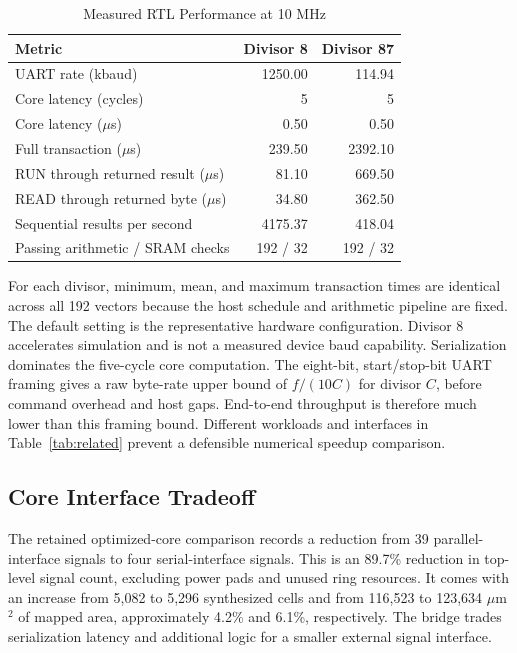 \documentclass[conference,letterpaper]{IEEEtran}
\begin{document}
\begin{table}[t]
\caption{Measured RTL Performance at 10 MHz}
\label{tab:performance}\centering\footnotesize
\begin{tabular}{lrr}\toprule
Metric & Divisor 8 & Divisor 87\\\midrule
UART rate (kbaud) & 1250.00 & 114.94\\
Core latency (cycles) & 5 & 5\\
Core latency ($\mu$s) & 0.50 & 0.50\\
Full transaction ($\mu$s) & 239.50 & 2392.10\\
RUN through returned result ($\mu$s) & 81.10 & 669.50\\
READ through returned byte ($\mu$s) & 34.80 & 362.50\\
Sequential results per second & 4175.37 & 418.04\\
Passing arithmetic / SRAM checks & 192 / 32 & 192 / 32\\\bottomrule
\end{tabular}
\end{table}

For each divisor, minimum, mean, and maximum transaction times are identical across all 192 vectors because the host schedule and arithmetic pipeline are fixed. The default setting is the representative hardware configuration. Divisor 8 accelerates simulation and is not a measured device baud capability. Serialization dominates the five-cycle core computation. The eight-bit, start/stop-bit UART framing gives a raw byte-rate upper bound of $f/(10C)$ for divisor $C$, before command overhead and host gaps. End-to-end throughput is therefore much lower than this framing bound. Different workloads and interfaces in Table~\ref{tab:related} prevent a defensible numerical speedup comparison.

\subsection{Core Interface Tradeoff}
The retained optimized-core comparison records a reduction from 39 parallel-interface signals to four serial-interface signals. This is an 89.7\% reduction in top-level signal count, excluding power pads and unused ring resources. It comes with an increase from 5,082 to 5,296 synthesized cells and from 116,523 to 123,634 $\mu$m$^2$ of mapped area, approximately 4.2\% and 6.1\%, respectively. The bridge trades serialization latency and additional logic for a smaller external signal interface.
\end{document}

